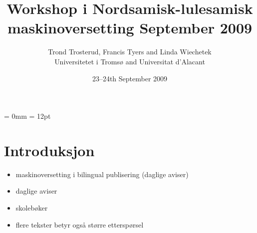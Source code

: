 \documentclass[a4paper,english,12pt]{article}
\begin{document}
\setcounter{secnumdepth}{3}
\setcounter{tocdepth}{3}
\begin{spacing}{1.0}


\newcommand{\tx}{\mbox{t\hspace{-.35em}-}} %

%  


\title{{\Large Workshop i Nordsamisk-lulesamisk maskinoversetting September 2009}} %




\author{Trond Trosterud, Francis Tyers and Linda Wiechetek \\
		Universitetet i Tromsø and Universitat d'Alacant}
\date{23--24th September 2009}

\maketitle




\thispagestyle{empty} %

\setcounter{page}{1} %

\parindent = 0mm
\parskip = 12pt



\section{Introduksjon}

\begin{itemize}
\item maskinoversetting i bilingual publisering (daglige aviser)
\item daglige aviser
\item skolebøker
\item flere tekster betyr også større etterspørsel
\end{itemize}


\end{spacing}
\end{document}
